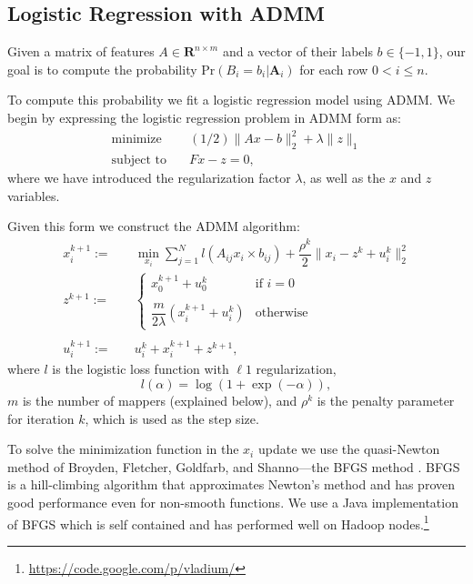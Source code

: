\documentclass[10pt, conference, compsocconf]{IEEEtran}
\begin{document}
\subsection{Logistic Regression with ADMM}
Given a matrix of features $A\in\mathbf{R}^{n\times m}$ and a vector of their labels $b\in\{-1,1\}$, our goal is to compute the probability $\text{Pr}(B_i=b_i|\mathbf{A}_i)$ for each row $0<i\leq n$.

To compute this probability we fit a logistic regression model using ADMM.  We begin by expressing the logistic regression problem in ADMM form as:
\begin{align*}
\text{minimize}&\quad (1/2)\|Ax-b\|_2^2+\lambda\|z\|_1\\
\text{subject to}&\quad Fx-z=0,
\end{align*}
where we have introduced the regularization factor $\lambda$, as well as the $x$ and $z$ variables.

Given this form we construct the ADMM algorithm:
\begin{align}
\label{eq:x}
x_i^{k+1} :=&\quad \min_{x_i} \sum_{j=1}^Nl(A_{ij}x_i\times b_{ij}) + \dfrac{\rho^k}{2}\|x_i - z^k + u_i^k\|_2^2\\
\label{eq:z}
z^{k+1} :=&\quad \begin{cases}
    x_0^{k+1} + u_0^k& \text{if $i=0$}\\
    \\
    \dfrac{m}{2\lambda}(x_i^{k+1} + u_i^k)& \text{otherwise}
  \end{cases}\\
\nonumber\\
\label{eq:u}
u_i^{k+1} :=&\quad u_i^k + x_i^{k+1} + z^{k+1},
\end{align}
where $l$ is the logistic loss function with $\ell1$ regularization,
\begin{equation*}
l(\alpha)=\log(1+\exp(-\alpha)),
\end{equation*}
$m$ is the number of mappers (explained below), and $\rho^k$ is the penalty parameter for iteration $k$, which is used as the step size.

To solve the minimization function in the $x_i$ update we use the quasi-Newton method of Broyden, Fletcher, Goldfarb, and Shanno---the BFGS method \cite{bonnans2003numerical}.  BFGS is a hill-climbing algorithm that approximates Newton's method and has proven good performance even for non-smooth functions.  We use a Java implementation of BFGS which is self contained and has performed well on Hadoop nodes.\footnote{\url{https://code.google.com/p/vladium/}}
\end{document}
